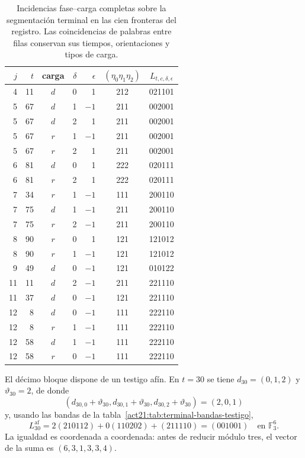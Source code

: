 \begin{table}[htbp]
\centering\small
\begin{tabular}{rrcrrc c}
\toprule
$j$&$t$&carga&$\delta$&$\epsilon$&$(\eta_0\eta_1\eta_2)$&$L_{t,c,\delta,\epsilon}$\\
\midrule
4&11&$d$&0& 1&212&021101\\
5&67&$d$&1&$-1$&211&002001\\
5&67&$d$&2& 1&211&002001\\
5&67&$r$&1&$-1$&211&002001\\
5&67&$r$&2& 1&211&002001\\
6&81&$d$&0& 1&222&020111\\
6&81&$r$&2& 1&222&020111\\
7&34&$r$&1&$-1$&111&200110\\
7&75&$d$&1&$-1$&211&200110\\
7&75&$r$&2&$-1$&211&200110\\
8&90&$r$&0& 1&121&121012\\
8&90&$r$&1&$-1$&121&121012\\
9&49&$d$&0&$-1$&121&010122\\
11&11&$d$&2&$-1$&211&221110\\
11&37&$d$&0&$-1$&121&221110\\
12&8&$d$&0&$-1$&111&222110\\
12&8&$r$&1&$-1$&111&222110\\
12&58&$d$&1&$-1$&111&222110\\
12&58&$r$&0&$-1$&111&222110\\
\bottomrule
\end{tabular}
\caption{Incidencias fase--carga completas sobre la segmentación terminal
en las cien fronteras del registro. Las coincidencias de palabras entre
filas conservan sus tiempos, orientaciones y tipos de carga.}
\label{act21:tab:terminal-incidencias-completas}
\end{table}

El décimo bloque dispone de un testigo afín. En $t=30$ se tiene
$d_{30}=(0,1,2)$ y $\vartheta_{30}=2$, de donde
\[
 (d_{30,0}+\vartheta_{30},d_{30,1}+\vartheta_{30},
 d_{30,2}+\vartheta_{30})=(2,0,1)
\]
y, usando las bandas de la tabla~\ref{act21:tab:terminal-bandas-testigo},
\[
 L^{\mathrm{af}}_{30}
 =2(210112)+0(110202)+(211110)
 =(001001)\quad\text{en }\mathbb F_3^6.
\]
La igualdad es coordenada a coordenada: antes de reducir módulo tres,
el vector de la suma es $(6,3,1,3,3,4)$.

